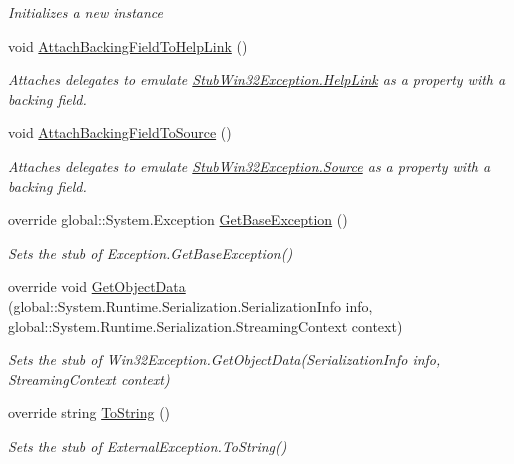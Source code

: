 \begin{DoxyCompactItemize}
\begin{DoxyCompactList}\small\item\em Initializes a new instance\end{DoxyCompactList}\item 
void \hyperlink{class_system_1_1_component_model_1_1_fakes_1_1_stub_win32_exception_a4d7a5829dc25d579cb85fbb5900f5848}{Attach\-Backing\-Field\-To\-Help\-Link} ()
\begin{DoxyCompactList}\small\item\em Attaches delegates to emulate \hyperlink{class_system_1_1_component_model_1_1_fakes_1_1_stub_win32_exception_a7faa70e41e6da22c0f30ec3cf6b4ce82}{Stub\-Win32\-Exception.\-Help\-Link} as a property with a backing field.\end{DoxyCompactList}\item 
void \hyperlink{class_system_1_1_component_model_1_1_fakes_1_1_stub_win32_exception_a8227d7ace666c1ad39248ad1a8b29277}{Attach\-Backing\-Field\-To\-Source} ()
\begin{DoxyCompactList}\small\item\em Attaches delegates to emulate \hyperlink{class_system_1_1_component_model_1_1_fakes_1_1_stub_win32_exception_a1d58a0bf5a4960b001540de55b6795e2}{Stub\-Win32\-Exception.\-Source} as a property with a backing field.\end{DoxyCompactList}\item 
override global\-::\-System.\-Exception \hyperlink{class_system_1_1_component_model_1_1_fakes_1_1_stub_win32_exception_ab34ba40f6e1cfee63d828df35f84fa93}{Get\-Base\-Exception} ()
\begin{DoxyCompactList}\small\item\em Sets the stub of Exception.\-Get\-Base\-Exception()\end{DoxyCompactList}\item 
override void \hyperlink{class_system_1_1_component_model_1_1_fakes_1_1_stub_win32_exception_ad5a71af0b17a22c373226f6918f031cd}{Get\-Object\-Data} (global\-::\-System.\-Runtime.\-Serialization.\-Serialization\-Info info, global\-::\-System.\-Runtime.\-Serialization.\-Streaming\-Context context)
\begin{DoxyCompactList}\small\item\em Sets the stub of Win32\-Exception.\-Get\-Object\-Data(\-Serialization\-Info info, Streaming\-Context context)\end{DoxyCompactList}\item 
override string \hyperlink{class_system_1_1_component_model_1_1_fakes_1_1_stub_win32_exception_a84691ef06ffc71e51fcc8f50ce6a082c}{To\-String} ()
\begin{DoxyCompactList}\small\item\em Sets the stub of External\-Exception.\-To\-String()\end{DoxyCompactList}\end{DoxyCompactItemize}
